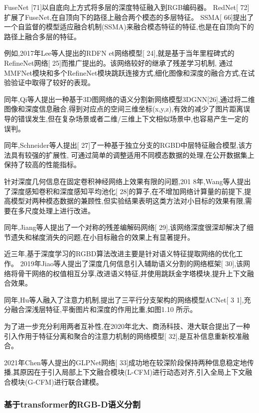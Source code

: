 FuseNet [71]以自底向上方式将多层的深度特征融入到RGB编码器。
RedNet[ 72]扩展了FuseNet,在自顶向下的路径上融合两个模态的多层特征。
SSMA[ 66]提出了一个自监督的模型适应融合机制(SSMA)来融合模态特征的特征,也是在自顶向下的路径上融合多层的特征。


例如,2017年Lee等人提出的RDFN et网络模型[ 24],就是基于当年里程碑式的RefineNet网络[ 25]而推广提出的。该网络较好的继承了残差学习机制, 通过MMFNet模块和多个RefineNet模块跳跃连接方式,细化图像和深度的融合方式,在试验验证中取得了较好的表现。

同年,Qi等人提出一种基于3D图网络的语义分割新网络模型3DGNN[26],通过将二维图像和深度信息融合,得到对应点的空间三维坐标(x,y,z),有效的减少了图片距离误导的错误发生,但在复杂场景或者二维/三维上下文相似场景中,也容易产生一定的误判。

同年,Schneider等人提出[ 27]了一种基于独立分支的RGBD中层特征融合模型,该方法具有较强的扩展性, 可通过简单的调整适用不同模态数据的处理,在公开数据集上保持了较高的性能指标。

针对深度几何信息在固定卷积神经网络上效果有限的问题,201 8年,Wang等人提出了深度感知卷积和深度感知平均池化[ 28]的算子,在不增加网络计算量的前提下,提高模型对两种模态数据的兼顾性,但实验结果表明这类方法对小目标的效果有限,需要在多尺度处理上进行改进。

同年,Jiang等人提出了一个对称的残差编解码网络[ 29],该网络深度很深却解决了细节遗失和梯度消失的问题,在小目标融合的效果上有显著提升。

近三年,基于深度学习的RGBD算法改进主要是针对语义特征提取网络的优化工作。
2019年Jiao等人提出了深度几何信息引入辅助语义分割的网络框架[ 30],该网络将骨干网络的权值相互分享,改进语义特征,并使用跳跃金字塔模块,提升上下文融合效果。

同年,Hu等人融入了注意力机制,提出了三平行分支架构的网络模型ACNet[ 3 1],充分融合深浅层特征,平衡图片和深度的作用比重,如图1.10 所示。

为了进一步充分利用两者互补性,在2020年北大、商汤科技、港大联合提出了一种引入作用于特征分离和聚合的注意力机制的网络模型[ 32],是互补信息重新校准融合。

2021年Chen等人提出的GLPNet网络[ 33]成功地在较深阶段保持两种信息稳定地传播,其原因在于引入局部上下文融合模块(L-CFM)进行动态对齐,引入全局上下文融合模块(G-CFM)进行联合建模。
\fi








\subsubsection{基于transformer的RGB-D语义分割}


